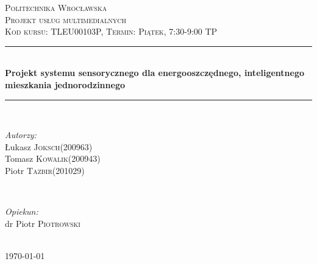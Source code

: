 \documentclass[12pt]{article} %
\begin{document}

\begin{titlepage}

\newcommand{\HRule}{\rule{\linewidth}{0.5mm}} %

\center %

\textsc{\LARGE Politechnika Wrocławska}\\[1.5cm] %
\textsc{\Large Projekt usług multimedialnych}\\[0.5cm] %
\textsc{\large Kod kursu: TLEU00103P, Termin: Piątek, 7:30-9:00 TP}\\[0.5cm] %

\HRule \\[0.4cm]
{ \huge \bfseries Projekt systemu sensorycznego dla energooszczędnego, inteligentnego mieszkania jednorodzinnego}\\[0.4cm] %
\HRule \\[1.5cm]

\begin{minipage}{0.4\textwidth}
\begin{flushleft} \large
\emph{Autorzy:}\\
Łukasz \textsc{Joksch}(200963) \\
Tomasz \textsc{Kowalik}(200943) \\
Piotr \textsc{Tazbir}(201029)
\end{flushleft}
\end{minipage}
~
\begin{minipage}{0.4\textwidth}
\begin{flushright} \large
\emph{Opiekun:} \\
dr Piotr \textsc{Piotrowski} %
\end{flushright}
\end{minipage}\\[4cm]

{\large \today}\\[3cm] %


\vfill %

\end{titlepage}
\end{document}
